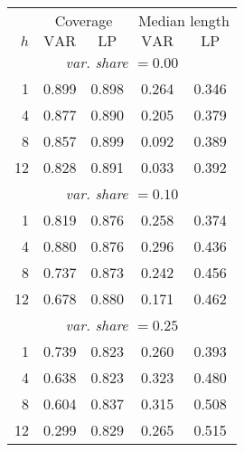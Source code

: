 \begin{tabular}{r|cc|cc}
& \multicolumn{2}{c|}{Coverage} & \multicolumn{2}{c}{Median length} \\
$h$ & $\text{VAR}$ & $\text{LP}$ & $\text{VAR}$ & $\text{LP}$ \\
\hline
\multicolumn{5}{c}{\emph{var. share $= 0.00$}} \\
  1 & 0.899 & 0.898 & 0.264 & 0.346 \\
  4 & 0.877 & 0.890 & 0.205 & 0.379 \\
  8 & 0.857 & 0.899 & 0.092 & 0.389 \\
 12 & 0.828 & 0.891 & 0.033 & 0.392 \\
\multicolumn{5}{c}{\emph{var. share $= 0.10$}} \\
  1 & 0.819 & 0.876 & 0.258 & 0.374 \\
  4 & 0.880 & 0.876 & 0.296 & 0.436 \\
  8 & 0.737 & 0.873 & 0.242 & 0.456 \\
 12 & 0.678 & 0.880 & 0.171 & 0.462 \\
\multicolumn{5}{c}{\emph{var. share $= 0.25$}} \\
  1 & 0.739 & 0.823 & 0.260 & 0.393 \\
  4 & 0.638 & 0.823 & 0.323 & 0.480 \\
  8 & 0.604 & 0.837 & 0.315 & 0.508 \\
 12 & 0.299 & 0.829 & 0.265 & 0.515 \\
\end{tabular}
